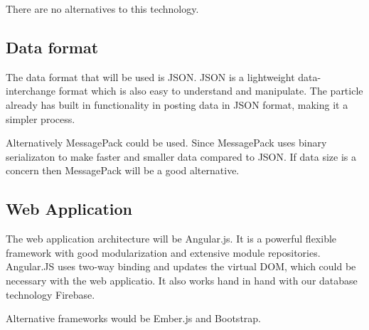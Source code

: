 \documentclass[paper=a4, fontsize=11pt]{scrartcl} %
\begin{document}
	There are no alternatives to this technology.
	\subsection{Data format}
	The data format that will be used is JSON. JSON is a lightweight data-interchange format which is also easy to understand and
	manipulate. The particle already has built in functionality in posting data in JSON format, making it a simpler process.
	
	Alternatively MessagePack could be used. Since MessagePack uses binary serializaton to make faster and smaller data compared to JSON.
	If data size is a concern then MessagePack will be a good alternative.
	\subsection{Web Application}
	The web application architecture will be Angular.js. It is a powerful flexible framework with good modularization and extensive module
	repositories. Angular.JS uses two-way binding and updates the virtual DOM, which could be necessary with the web applicatio. It also works
	hand in hand with our database technology Firebase.
	
	Alternative frameworks would be Ember.js and Bootstrap.
\end{document}
